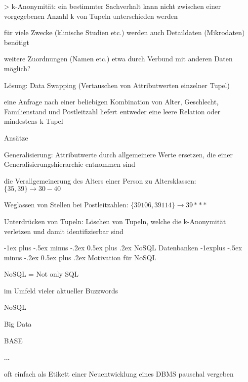 \documentclass[a4paper]{article}
\makeatletter
\renewcommand{\section}{\@startsection{section}{1}{0mm}%
                                {-1ex plus -.5ex minus -.2ex}%
                                {0.5ex plus .2ex}%
                                {\normalfont\large\bfseries}}
\renewcommand{\subsection}{\@startsection{subsection}{2}{0mm}%
                                {-1explus -.5ex minus -.2ex}%
                                {0.5ex plus .2ex}%
                                {\normalfont\normalsize\bfseries}}
\makeatother
\begin{document}
\begin{multicols}{3}
\begin{itemize*}
        > k-Anonymität: ein bestimmter Sachverhalt kann nicht zwischen einer vorgegebenen Anzahl k von Tupeln unterschieden werden
        \begin{itemize*}
            \item für viele Zwecke (klinische Studien etc.) werden auch Detaildaten (Mikrodaten) benötigt
            \begin{itemize*}
                \item weitere Zuordnungen (Namen etc.) etwa durch Verbund mit anderen Daten möglich?
                \item Lösung: Data Swapping (Vertauschen von Attributwerten einzelner Tupel)
                \item eine Anfrage nach einer beliebigen Kombination von Alter, Geschlecht, Familienstand und Postleitzahl liefert entweder eine leere Relation oder mindestens k Tupel
            \end{itemize*}
            \item Ansätze
            \begin{itemize*}
                \item Generalisierung: Attributwerte durch allgemeinere Werte ersetzen, die einer Generalisierungshierarchie entnommen sind
                \item die Verallgemeinerung des Alters einer Person zu Altersklassen: $\{35, 39\} \rightarrow 30-40$
                \item Weglassen von Stellen bei Postleitzahlen: $\{ 39106, 39114 \}\rightarrow 39***$
                \item Unterdrücken von Tupeln: Löschen von Tupeln, welche die k-Anonymität verletzen und damit identifizierbar sind
            \end{itemize*}
        \end{itemize*}

        \section{NoSQL Datenbanken}
        \subsection{Motivation für NoSQL}
        \begin{itemize*}
            \item NoSQL = Not only SQL
            \item im Umfeld vieler aktueller Buzzwords
            \begin{itemize*}
                \item NoSQL
                \item Big Data
                \item BASE
                \item ...
            \end{itemize*}
            \item oft einfach als Etikett einer Neuentwicklung eines DBMS pauschal vergeben
        \end{itemize*}


\end{itemize*}
\end{multicols}
\end{document}
